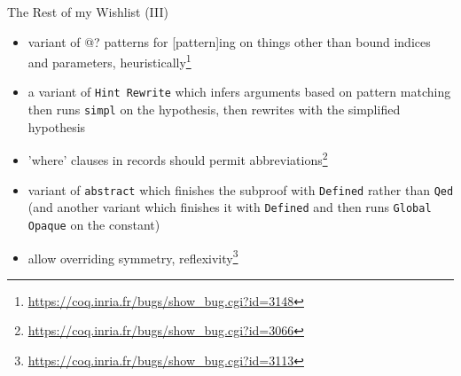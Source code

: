 \documentclass{beamer}
\begin{document}
\begin{frame}{The Rest of my Wishlist (III)}
\begin{itemize}
  \item 
    variant of @? patterns for [pattern]ing on things other than bound indices and parameters, heuristically\footnote{\url{https://coq.inria.fr/bugs/show\_bug.cgi?id=3148}}
  \item 
    a variant of \texttt{Hint Rewrite} which infers arguments based on pattern matching then runs \texttt{simpl} on the hypothesis, then rewrites with the simplified hypothesis
  \item 
    'where' clauses in records should permit abbreviations\footnote{\url{https://coq.inria.fr/bugs/show\_bug.cgi?id=3066}}
  \item 
    variant of \texttt{abstract} which finishes the subproof with \texttt{Defined} rather than \texttt{Qed} (and another variant which finishes it with \texttt{Defined} and then runs \texttt{Global Opaque} on the constant)
  \item 
    allow overriding symmetry, reflexivity\footnote{\url{https://coq.inria.fr/bugs/show\_bug.cgi?id=3113}}
\end{itemize}
\end{frame}
\end{document}
